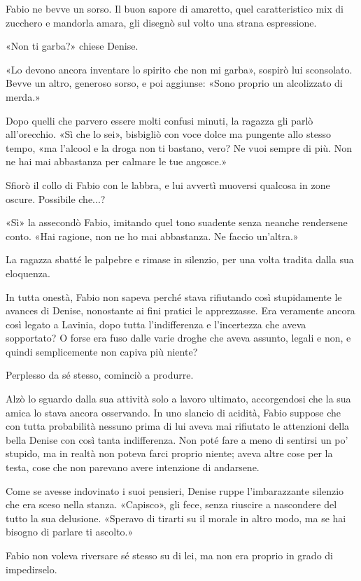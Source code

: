 Fabio ne bevve un sorso. Il buon sapore di amaretto, quel caratteristico mix di zucchero e mandorla amara, gli disegnò sul volto una strana espressione.

«Non ti garba?» chiese Denise.

«Lo devono ancora inventare lo spirito che non mi garba», sospirò lui sconsolato. Bevve un altro, generoso sorso, e poi aggiunse: «Sono proprio un alcolizzato di merda.»

Dopo quelli che parvero essere molti confusi minuti, la ragazza gli parlò all'orecchio. «Sì che lo sei», bisbigliò con voce dolce ma pungente allo stesso tempo, «ma l'alcool e la droga non ti bastano, vero? Ne vuoi sempre di più. Non ne hai mai abbastanza per calmare le tue angosce.»

Sfiorò il collo di Fabio con le labbra, e lui avvertì muoversi qualcosa in zone oscure. Possibile che...?

«Sì» la assecondò Fabio, imitando quel tono suadente senza neanche rendersene conto. «Hai ragione, non ne ho mai abbastanza. Ne faccio un'altra.»

La ragazza sbatté le palpebre e rimase in silenzio, per una volta tradita dalla sua eloquenza.

In tutta onestà, Fabio non sapeva perché stava rifiutando così stupidamente le avances di Denise, nonostante ai fini pratici le apprezzasse. Era veramente ancora così legato a Lavinia, dopo tutta l'indifferenza e l'incertezza che aveva sopportato? O forse era fuso dalle varie droghe che aveva assunto, legali e non, e quindi semplicemente non capiva più niente?

Perplesso da sé stesso, cominciò a produrre.

Alzò lo sguardo dalla sua attività solo a lavoro ultimato, accorgendosi che la sua amica lo stava ancora osservando. In uno slancio di acidità, Fabio suppose che con tutta probabilità nessuno prima di lui aveva mai rifiutato le attenzioni della bella Denise con così tanta indifferenza. Non poté fare a meno di sentirsi un po' stupido, ma in realtà non poteva farci proprio niente; aveva altre cose per la testa, cose che non parevano avere intenzione di andarsene.

Come se avesse indovinato i suoi pensieri, Denise ruppe l'imbarazzante silenzio che era sceso nella stanza. «Capisco», gli fece, senza riuscire a nascondere del tutto la sua delusione. «Speravo di tirarti su il morale in altro modo, ma se hai bisogno di parlare ti ascolto.»

Fabio non voleva riversare sé stesso su di lei, ma non era proprio in grado di impedirselo.

